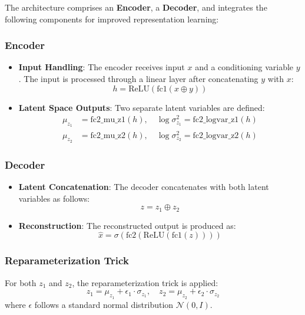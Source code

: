 \documentclass[12pt,letterpaper]{article}
\begin{document}
The architecture comprises an \textbf{Encoder}, a \textbf{Decoder}, and integrates the following components for improved representation learning:

\subsubsection{Encoder}

\begin{itemize}
    \item \textbf{Input Handling}: The encoder receives input $x$ and a conditioning variable $y$. The input is processed through a linear layer after concatenating $y$ with $x$:
    \[
    h = \text{ReLU}(\text{fc1}(x \oplus y))
    \]
    
    \item \textbf{Latent Space Outputs}: Two separate latent variables are defined:
    \begin{align*}
        \mu_{z_1} &= \text{fc2\_mu\_z1}(h), \quad \log \sigma_{z_1}^2 = \text{fc2\_logvar\_z1}(h)  \\
        \mu_{z_2} &= \text{fc2\_mu\_z2}(h), \quad \log \sigma_{z_2}^2 = \text{fc2\_logvar\_z2}(h)
    \end{align*}
\end{itemize}

\subsubsection{Decoder}

\begin{itemize}
    \item \textbf{Latent Concatenation}: The decoder concatenates with both latent variables as follows:
    \[
    z = z_1 \oplus z_2
    \]
    
    \item \textbf{Reconstruction}: The reconstructed output is produced as:
    \[
    \hat{x} = \sigma(\text{fc2}(\text{ReLU}(\text{fc1}(z))))
    \]
\end{itemize}

\subsubsection{Reparameterization Trick}

For both $z_1$ and $z_2$, the reparameterization trick is applied:
\[
z_1 = \mu_{z_1} + \epsilon_1 \cdot \sigma_{z_1}, \quad z_2 = \mu_{z_2} + \epsilon_2 \cdot \sigma_{z_2}
\]
where $\epsilon$ follows a standard normal distribution $\mathcal{N}(0, I)$.
\end{document}
